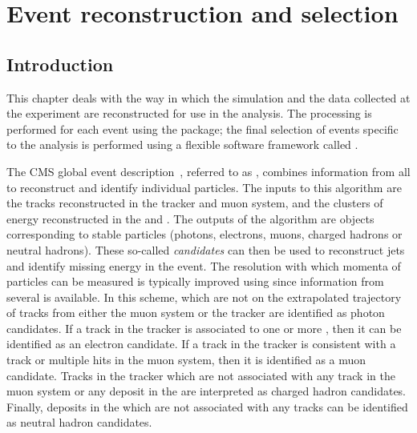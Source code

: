 \chapter{Event reconstruction and selection}
\label{chap:reconstruction}


\section{Introduction}
\label{reco:sec:intro}

This chapter deals with the way in which the simulation and the data collected at the \CMS experiment are reconstructed for use in the \Hgg analysis. 
The processing is performed for each event using the \CMSSW package; the final selection  of events specific to the \Hgg analysis is performed using a flexible software framework called \FLASHgg. %

The CMS global event description~\cite{CMS-PAS-PFT-09-001,CMS-PAS-PFT-10-001}, referred to as \PF, combines information from all \CMS \subdetector\s to reconstruct and identify individual particles. The inputs to this algorithm are the tracks reconstructed in the tracker and muon system, and the clusters of energy reconstructed in the \ECAL and \HCAL. The outputs of the algorithm are objects corresponding to stable particles (photons, electrons, muons, charged hadrons or neutral hadrons). These so-called \PF \emph{candidates} can then be used to reconstruct jets and identify missing energy in the event. The resolution with which momenta of particles can be measured is typically improved using \PF since information from several \subdetector\s is available. In this scheme, \ECAL \SC\s which are not on the extrapolated trajectory of tracks from either the muon system or the tracker are identified as photon candidates. If a track in the tracker is associated to one or more \ECAL \SC\s, then it can be identified as an electron candidate. If a track in the tracker is consistent with a track or multiple hits in the muon system, then it is identified as a muon candidate. Tracks in the tracker which are not associated with any track in the muon system or any deposit in the \ECAL are interpreted as charged hadron candidates. Finally, deposits in the \HCAL which are not associated with any tracks can be identified as neutral hadron candidates.  

